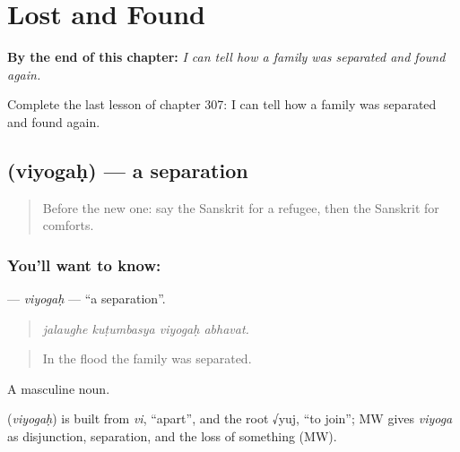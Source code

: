 
\chapter{Lost and Found}
\label{ch:sa-lost-and-found}

\begin{chapteropening}
\textbf{By the end of this chapter:} \emph{I can tell how a family was separated and found again.}

Complete the last lesson of chapter 307: I can tell how a family was separated and found again.
\end{chapteropening}

\section[\texorpdfstring{\sk{वियोगः} (viyogaḥ)}{वियोगः (viyogaḥ)}]{ (viyogaḥ) — a separation}

\label{lesson:SA-C307-viyogah}



\begin{quote}
Before the new one: say the Sanskrit for a refugee, then the Sanskrit for comforts.
\end{quote}

\subsection*{You'll want to know: }
\textbf{} — \emph{viyogaḥ} — \textquotedblleft{}a separation\textquotedblright{}.

\begin{quote}
   
\end{quote}

\begin{quote}
\emph{jalaughe kuṭumbasya viyogaḥ abhavat.}
\end{quote}

\begin{quote}
In the flood the family was separated.
\end{quote}

A masculine noun.

\begin{cousinweb}
\textbf{} (\emph{viyogaḥ}) is built from \emph{vi}, \textquotedblleft{}apart\textquotedblright{}, and the root √yuj, \textquotedblleft{}to join\textquotedblright{}; MW gives \emph{viyoga} as disjunction, separation, and the loss of something (MW).
\end{cousinweb}


